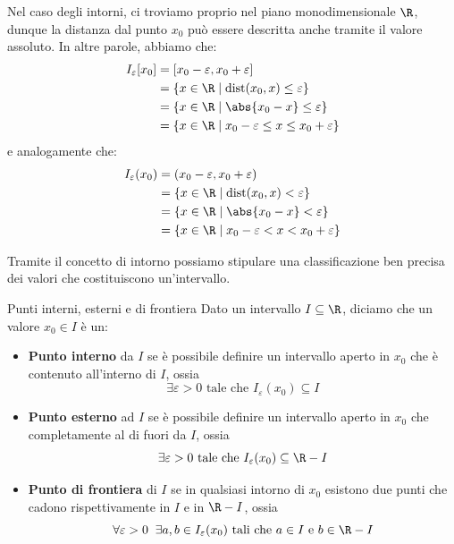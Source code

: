 \documentclass[a4paper, 12pt]{report}
\begin{document}
    Nel caso degli intorni, ci troviamo proprio nel piano monodimensionale $\R$, dunque la distanza dal punto $x_0$ può essere descritta anche tramite il valore assoluto. In altre parole, abbiamo che:
    \[\begin{split}
        I_\varepsilon[x_0] &= [x_0-\varepsilon, x_0 + \varepsilon] \\
        &= \{x \in \R \mid \mathrm{dist}(x_0, x) \leq \varepsilon\} \\
        &= \{x \in \R \mid \abs{x_0-x} \leq \varepsilon\} \\
        &= \{x \in \R \mid x_0 - \varepsilon \leq x \leq x_0 + \varepsilon\} \\
    \end{split}\]
    e analogamente che:
    \[\begin{split}
        I_\varepsilon(x_0) &= (x_0-\varepsilon, x_0 + \varepsilon) \\
        &= \{x \in \R \mid \mathrm{dist}(x_0, x) < \varepsilon\} \\
        &= \{x \in \R \mid \abs{x_0-x} < \varepsilon\} \\
        &= \{x \in \R \mid x_0 - \varepsilon < x < x_0 + \varepsilon\} \\
    \end{split}\]

    Tramite il concetto di intorno possiamo stipulare una classificazione ben precisa dei valori che costituiscono un'intervallo.

    \begin{frameddefn}{Punti interni, esterni e di frontiera}
        Dato un intervallo $I \subseteq \R$, diciamo che un valore $x_0 \in I$ è un:
        \begin{itemize}
            \item \textbf{Punto interno} da $I$ se è possibile definire un intervallo aperto in $x_0$ che è contenuto all'interno di $I$, ossia 
            \[\exists \varepsilon >0 \text{ tale che } I_\varepsilon(x_0) \subseteq I\]
            
            \item \textbf{Punto esterno} ad $I$ se è possibile definire un intervallo aperto in $x_0$ che completamente al di fuori da $I$, ossia 
            \[\exists \varepsilon >0 \text{ tale che } I_\varepsilon(x_0) \subseteq \R-I\]

            \item \textbf{Punto di frontiera} di $I$ se in qualsiasi intorno di $x_0$ esistono due punti che cadono rispettivamente in $I$ e in $\R-I$, ossia
            \[\forall \varepsilon >0 \;\; \exists a,b \in I_\varepsilon(x_0) \text{ tali che } a \in I \text{ e } b \in \R-I\]
        \end{itemize}
    \end{frameddefn}
\end{document}
